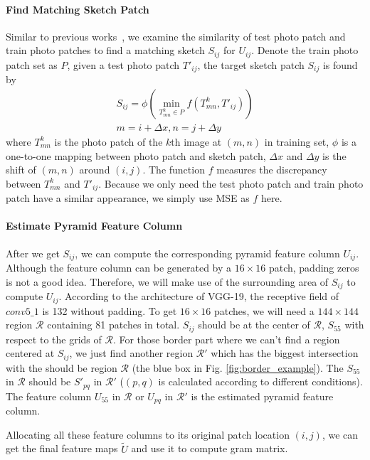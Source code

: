 \documentclass[10pt,twocolumn,letterpaper]{article}
\begin{document}
\paragraph*{Find Matching Sketch Patch} Similar to previous works~\cite{wang2009face,zhou2012markov}, we examine the similarity of test photo patch and train photo patches to find a matching sketch $S_{ij}$ for $U_{ij}$. Denote the train photo patch set as $P$, given a test photo patch $T'_{ij}$, the target sketch patch $S_{ij}$ is found by
\begin{gather}
S_{ij} = \phi(\min_{T^k_{mn} \in P} f(T^k_{mn}, T'_{ij})) \\
m = i + \Delta x, n = j + \Delta y
\end{gather}
where $T^k_{mn}$ is the photo patch of the $k$th image at $(m, n)$ in training set, $\phi$ is a one-to-one mapping between photo patch and sketch patch, $\Delta x$ and $\Delta y$ is the shift of $(m, n)$ around $(i, j)$. The function $f$ measures the discrepancy between $T^k_{mn}$ and $T'_{ij}$. Because we only need the test photo patch and train photo patch have a similar appearance, we simply use MSE as $f$ here.

\paragraph*{Estimate Pyramid Feature Column}
After we get $S_{ij}$, we can compute the corresponding pyramid feature column $U_{ij}$. Although the feature column can be generated by a $16\times16$ patch, padding zeros is not a good idea. Therefore, we will make use of the surrounding area of $S_{ij}$ to compute $U_{ij}$. According to the architecture of VGG-19, the receptive field of $conv5\_1$ is 132 without padding. To get $16\times16$ patches, we will need a $144\times144$ region $\mathcal{R}$ containing 81 patches in total. $S_{ij}$ should be at the center of $\mathcal{R}$, \ie $S_{55}$ with respect to the grids of $\mathcal{R}$. For those border part where we can't find a region centered at $S_{ij}$, we just find another region $\mathcal{R}'$ which has the biggest intersection with the should be region $\mathcal{R}$ (the blue box in Fig. \ref{fig:border_example}). The $S_{55}$ in $\mathcal{R}$  should be $S'_{pq}$ in $\mathcal{R}'$ ($(p, q)$ is calculated according to different conditions). The feature column $U_{55}$ in $\mathcal{R}$ or $U_{pq}$ in $\mathcal{R'}$ is the estimated pyramid feature column. 

Allocating all these feature columns to its original patch location $(i, j)$, we can get the final feature maps $\tilde{U}$ and use it to compute gram matrix.  
\end{document}
